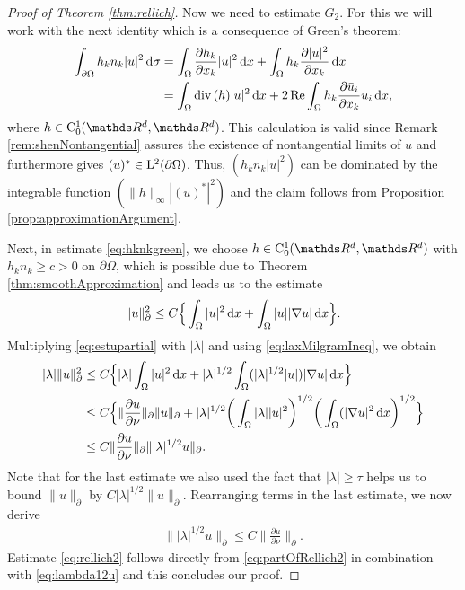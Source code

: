 \begin{proof}[Proof of Theorem \ref{thm:rellich}]
  Now we need to estimate $G_2$.
  For this we will work with the next identity which is a consequence of Green's theorem:
  \begin{align}
    \int_{\partial\Omega} h_k n_k |u|^2 \, {\operatorname{d}\!{\sigma}}
    &= \int_{\Omega} \frac{\partial h_k}{\partial x_k} |u|^2 \, {\operatorname{d}\!{x}} + \int_{\Omega} h_k \frac{\partial |u|^2}{\partial x_k}  \, {\operatorname{d}\!{x}} \nonumber\\
    \label{eq:hknkgreen}
    &= \int_\Omega \mathrm{div\,} (h) |u|^2 \, {\operatorname{d}\!{x}} + 2 \operatorname{Re} \int_\Omega h_k \frac{\partial \bar u_i}{\partial x_k} u_i \, {\operatorname{d}\!{x}},
  \end{align}
  where $h \in \CC_0^1(\R^d, \R^d)$.
  This calculation is valid since Remark \ref{rem:shenNontangential} assures the existence of nontangential limits of $u$ and furthermore gives $(u)^* \in \mathrm{L}^2(\partial\Omega)$. Thus, $( h_k n_k |u|^2 )$ can be dominated by the integrable function $(\|h\|_\infty |(u)^*|^2)$ and the claim follows from Proposition \ref{prop:approximationArgument}.

  Next, in estimate \eqref{eq:hknkgreen}, we choose $h \in \CC_0^1(\R^d, \R^d)$ with $h_k n_k \geq c > 0$ on $\partial\Omega$, which is possible due to Theorem \ref{thm:smoothApproximation} and leads us to the estimate 
  \begin{align}
    \label{eq:estupartial}
    \|u\|_\partial^2 \leq C \Big\{ \int_\Omega |u|^2 \, {\operatorname{d}\!{x}} +  \int_\Omega |u| |\nabla u| \, {\operatorname{d}\!{x}} \Big\}.
  \end{align}
  Multiplying  \eqref{eq:estupartial} with $|\lambda|$ and using \eqref{eq:laxMilgramIneq}, we obtain 
  \begin{align*}
    |\lambda| \|u\|_\partial^2 
    &\leq C \Big\{ |\lambda| \int_\Omega |u|^2 \, {\operatorname{d}\!{x}} + |\lambda|^{1/2}  \int_\Omega (|\lambda|^{1/2} |u|) |\nabla u| \, {\operatorname{d}\!{x}} \Big\} \nonumber\\
    &\leq C \Big\{ \|\frac{\partial u}{\partial \nu} \|_\partial \|u\|_\partial + |\lambda|^{1/2} \bigg( \int_\Omega |\lambda| |u|^2 \bigg)^{1/2} \bigg( \int_\Omega (|\nabla u|^2 \, {\operatorname{d}\!{x}} \bigg)^{1/2} \Big\} \\
    &\leq C \|\frac{\partial u}{\partial \nu} \|_\partial \||\lambda|^{1/2} u\|_\partial.
  \end{align*}
  Note that for the last estimate we also used the fact that $|\lambda| \geq \tau$ helps us to bound $\|u\|_\partial$ by $C |\lambda|^{1/2} \|u\|_\partial$.
  Rearranging terms in the last estimate, we now derive
  \begin{align}
    \label{eq:lambda12u}
    \| |\lambda|^{1/2} u\|_\partial \leq C \| \frac{\partial u}{\partial \nu} \|_\partial.
  \end{align}
  Estimate \eqref{eq:rellich2} follows directly from \eqref{eq:partOfRellich2} in combination with \eqref{eq:lambda12u} and this concludes our proof.
\end{proof}

